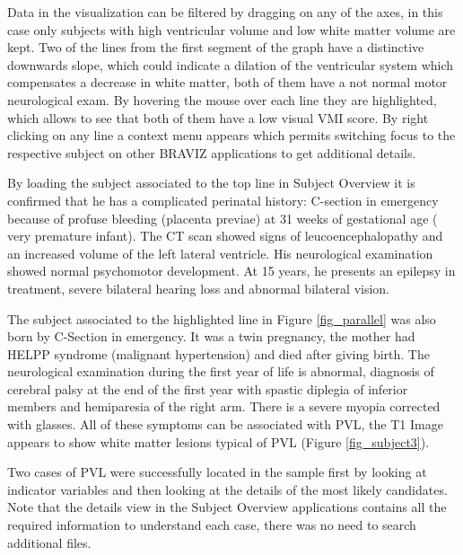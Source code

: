 \documentclass[twocolumn]{svjour3}
\begin{document}
Data in the visualization can be filtered by dragging on any of the axes, in this case only subjects with high ventricular volume and low white matter volume are kept. Two of the lines from the first segment of the graph have a distinctive downwards slope, which could indicate a dilation of the ventricular system which compensates a decrease in white matter, both of them have a not normal motor neurological exam. By hovering the mouse over each line they are highlighted, which allows to see that both of them have a low visual VMI score. By right clicking on any line a context menu appears which permits switching focus to the respective subject on other BRAVIZ applications to get additional details. 

By loading the subject associated to the top line in Subject Overview it is confirmed that he has a complicated perinatal history: C-section in emergency because of profuse bleeding (placenta previae) at 31 weeks of gestational age ( very premature infant). The  CT scan showed signs of leucoencephalopathy  and an  increased volume of the left lateral ventricle. His neurological examination showed normal psychomotor development. At 15 years, he presents an epilepsy in  treatment, severe bilateral hearing loss and abnormal bilateral vision.  

The subject associated to the highlighted line in Figure \ref{fig_parallel} was also born by C-Section in emergency. It was a twin pregnancy, the mother had HELPP syndrome (malignant hypertension) and died after giving birth. The neurological examination during the first year of life is abnormal, diagnosis of cerebral palsy at the end of the first year with spastic diplegia of inferior members and hemiparesia of the right arm.  There is a severe myopia corrected with glasses. All of these symptoms can be associated with PVL, the T1 Image appears to show white matter lesions typical of PVL (Figure \ref{fig_subject3}).

Two cases of PVL were successfully located in the sample first by looking at indicator variables and then looking at the details of the most likely candidates. Note that the details view in the Subject Overview applications contains all the required information to  understand each case, there was no need to search additional files. 
\end{document}

